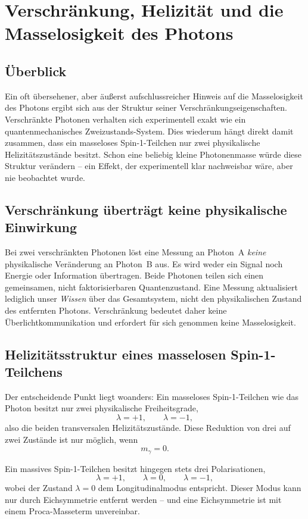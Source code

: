 \section{Verschränkung, Helizität und die Masselosigkeit des Photons}
\label{sec:verschränkung_masselosigkeit}

\subsection*{Überblick}
Ein oft übersehener, aber äußerst aufschlussreicher Hinweis auf die 
Masselosigkeit des Photons ergibt sich aus der Struktur seiner 
Verschränkungseigenschaften. Verschränkte Photonen verhalten sich 
experimentell exakt wie ein quantenmechanisches Zweizustands-System. 
Dies wiederum hängt direkt damit zusammen, dass ein masseloses 
Spin-1-Teilchen nur zwei physikalische Helizitätszustände besitzt. 
Schon eine beliebig kleine Photonenmasse würde diese Struktur verändern – 
ein Effekt, der experimentell klar nachweisbar wäre, aber nie beobachtet wurde.

\subsection*{Verschränkung überträgt keine physikalische Einwirkung}
Bei zwei verschränkten Photonen löst eine Messung an Photon~A 
\emph{keine} physikalische Veränderung an Photon~B aus. Es wird weder ein 
Signal noch Energie oder Information übertragen. Beide Photonen teilen 
sich einen gemeinsamen, nicht faktorisierbaren Quantenzustand. 
Eine Messung aktualisiert lediglich unser \emph{Wissen} über das 
Gesamtsystem, nicht den physikalischen Zustand des entfernten Photons. 
Verschränkung bedeutet daher keine Überlichtkommunikation und erfordert 
für sich genommen keine Masselosigkeit.

\subsection*{Helizitätsstruktur eines masselosen Spin-1-Teilchens}
Der entscheidende Punkt liegt woanders: Ein masseloses Spin-1-Teilchen 
wie das Photon besitzt nur zwei physikalische Freiheitsgrade,
\[
\lambda = +1, \qquad \lambda = -1,
\]
also die beiden transversalen Helizitätszustände.  
Diese Reduktion von drei auf zwei Zustände ist nur möglich, wenn
\[
m_\gamma = 0.
\]

Ein massives Spin-1-Teilchen besitzt hingegen stets drei Polarisationen,
\[
\lambda = +1, \qquad \lambda = 0, \qquad \lambda = -1,
\]
wobei der Zustand $\lambda = 0$ dem Longitudinalmodus entspricht.
Dieser Modus kann nur durch Eichsymmetrie entfernt werden – und eine 
Eichsymmetrie ist mit einem Proca-Masseterm unvereinbar.

